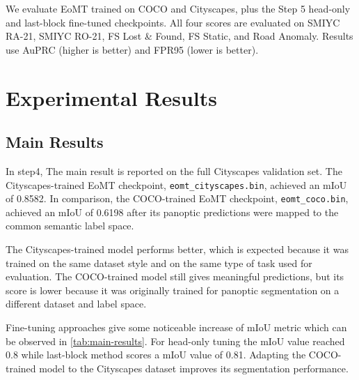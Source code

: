 \documentclass[10pt,twocolumn,letterpaper]{article}
\begin{document}
We evaluate EoMT trained on COCO and Cityscapes, plus the Step 5 head-only and
last-block fine-tuned checkpoints. All four scores are evaluated on SMIYC RA-21,
SMIYC RO-21, FS Lost \& Found, FS Static, and Road Anomaly.
Results use AuPRC (higher is better) and FPR95 (lower is better).

\section{Experimental Results}

\subsection{Main Results}

In step4, The main result is reported on the full Cityscapes validation set. The Cityscapes-trained EoMT checkpoint, \texttt{eomt\_cityscapes.bin}, achieved an mIoU of 0.8582. In comparison, the COCO-trained EoMT checkpoint, \texttt{eomt\_coco.bin}, achieved an mIoU of 0.6198 after its panoptic predictions were mapped to the common semantic label space.

The Cityscapes-trained model performs better, which is expected because it was trained on the same dataset style and on the same type of task used for evaluation. The COCO-trained model still gives meaningful predictions, but its score is lower because it was originally trained for panoptic segmentation on a different dataset and label space.

Fine-tuning approaches give some noticeable increase of mIoU metric which can be observed in \cref{tab:main-results}. For head-only tuning the mIoU value reached 0.8 while last-block method scores a mIoU value of 0.81. Adapting the COCO-trained model to the Cityscapes dataset improves its segmentation performance.
\begin{table}[t]
\centering
\caption{Post-hoc pixel-based baselines on ERFNet. Cells: AuPRC$\uparrow$ /
  FPR95$\downarrow$ (\%).}
\label{tab:pixel-based baselines}
\setlength{\tabcolsep}{3pt}
\scriptsize
{}
\end{table}
\end{document}
